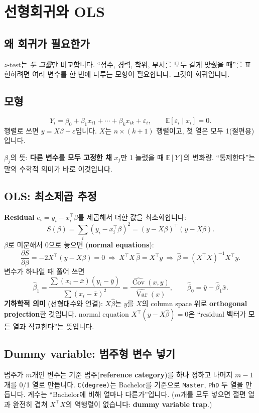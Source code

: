 \documentclass[11pt,a4paper]{article}
\newcommand{\E}{\mathbb{E}}
\newcommand{\Var}{\operatorname{Var}}
\newcommand{\Cov}{\operatorname{Cov}}
\newcommand{\term}[1]{\textbf{#1}}
\newcommand{\code}[1]{\texttt{#1}}
\begin{document}
\section{선형회귀와 OLS}

\subsection{왜 회귀가 필요한가}
$z$-test는 \emph{두 그룹}만 비교합니다. ``점수, 경력, 학위, 부서를 모두 같게 맞췄을 때''를 표현하려면 여러 변수를 한 번에 다루는 모형이 필요합니다. 그것이 회귀입니다.

\subsection{모형}
\[
Y_i=\beta_0+\beta_1x_{i1}+\cdots+\beta_kx_{ik}+\varepsilon_i,\qquad \E[\varepsilon_i\mid x_i]=0.
\]
행렬로 쓰면 $y=X\beta+\varepsilon$입니다. $X$는 $n\times(k+1)$ 행렬이고, 첫 열은 모두 1(절편용)입니다.

$\beta_j$의 뜻: \textbf{다른 변수를 모두 고정한 채} $x_j$만 1 늘렸을 때 $\E[Y]$의 변화량. ``통제한다''는 말의 수학적 의미가 바로 이것입니다.

\subsection{OLS: 최소제곱 추정}
\term{Residual} $e_i=y_i-x_i^\top\beta$를 제곱해서 더한 값을 최소화합니다:
\[
S(\beta)=\sum_i(y_i-x_i^\top\beta)^2=(y-X\beta)^\top(y-X\beta).
\]
$\beta$로 미분해서 0으로 놓으면 (\term{normal equations}):
\[
\frac{\partial S}{\partial\beta}=-2X^\top(y-X\beta)=0\ \Longrightarrow\ X^\top X\,\hat\beta=X^\top y\ \Longrightarrow\ \hat\beta=(X^\top X)^{-1}X^\top y.
\]
변수가 하나일 때 풀어 쓰면
\[
\hat\beta_1=\frac{\sum(x_i-\bar x)(y_i-\bar y)}{\sum(x_i-\bar x)^2}=\frac{\widehat{\Cov}(x,y)}{\widehat{\Var}(x)},\qquad \hat\beta_0=\bar y-\hat\beta_1\bar x.
\]
\textbf{기하학적 의미} (선형대수와 연결): $X\hat\beta$는 $y$를 $X$의 column space 위로 \term{orthogonal projection}한 것입니다. normal equation $X^\top(y-X\hat\beta)=0$은 ``residual 벡터가 모든 열과 직교한다''는 뜻입니다.

\subsection{Dummy variable: 범주형 변수 넣기}
범주가 $m$개인 변수는 기준 범주(\term{reference category})를 하나 정하고 나머지 $m-1$개를 0/1 열로 만듭니다. \code{C(degree)}는 Bachelor를 기준으로 \code{Master}, \code{PhD} 두 열을 만듭니다. 계수는 ``Bachelor에 비해 얼마나 다른가''입니다. ($m$개를 모두 넣으면 절편 열과 완전히 겹쳐 $X^\top X$의 역행렬이 없습니다: \term{dummy variable trap}.)
\end{document}
